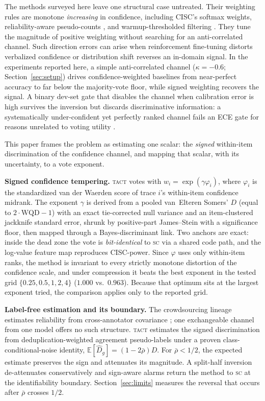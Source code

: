 \documentclass{article}
\newcommand{\Dhat}{\widehat{D}}
\newcommand{\SC}{\textsc{sc}}
\newcommand{\TACT}{\textsc{tact}}
\begin{document}
The methods surveyed here leave one structural case untreated. Their weighting
rules are monotone \emph{increasing} in confidence, including CISC's softmax
weights, reliability-aware pseudo-counts \citep{reasc2026}, and
warmup-thresholded filtering \citep{deepconf2025}. They tune the magnitude of
positive weighting without searching for an anti-correlated channel. Such
direction errors can arise when reinforcement fine-tuning distorts verbalized
confidence or distribution shift reverses an in-domain signal. In the
experiments reported here, a simple anti-correlated channel ($\kappa=-0.6$;
Section~\ref{sec:setup}) drives confidence-weighted baselines from near-perfect
accuracy to far below the majority-vote floor, while signed weighting recovers
the signal. A binary dev-set gate that disables the channel when calibration
error is high survives the inversion but discards discriminative information:
a systematically under-confident yet perfectly ranked channel fails an ECE
gate for reasons unrelated to voting utility
\citep{taubenfeld2025cisc,huang2024rankcalibration}.

This paper frames the problem as estimating one scalar: the \emph{signed} within-item discrimination of the confidence channel, and mapping that scalar, with its uncertainty, to a vote exponent.

\textbf{Signed confidence tempering.} \TACT{} votes with
$w_i=\exp(\gamma\varphi_i)$, where $\varphi_i$ is the standardized van der
Waerden score of trace $i$'s within-item confidence midrank. The exponent
$\gamma$ is derived from a pooled van~Elteren Somers' $D$ (equal to
$2\cdot\mathrm{WQD}-1$) with an exact tie-corrected null variance and an
item-clustered jackknife standard error, shrunk by positive-part James--Stein
with a significance floor, then mapped through a Bayes-discriminant link. Two
anchors are exact: inside the dead zone the vote is \emph{bit-identical} to
\SC{} via a shared code path, and the log-value feature map reproduces
CISC-power. Since $\varphi$ uses only within-item ranks, the method is
invariant to every strictly monotone distortion of the confidence scale, and
under compression it beats the best exponent in the tested grid
$\{0.25,0.5,1,2,4\}$ ($1.000$ vs.\ $0.963$). Because that optimum sits at the
largest exponent tried, the comparison applies only to the reported grid.

\textbf{Label-free estimation and its boundary.} The crowdsourcing lineage
estimates reliability from cross-annotator covariance
\citep{dawid1979maximum,parisi2014ranking}; one exchangeable channel from one
model offers no such structure. \TACT{} estimates the signed discrimination
from deduplication-weighted agreement pseudo-labels under a proven
class-conditional-noise identity, $\mathbb{E}[\Dhat_g]=(1-2\bar\rho)D$. For
$\bar\rho<1/2$, the expected estimate preserves the sign and attenuates its
magnitude. A split-half inversion
de-attenuates conservatively and sign-aware alarms return the method to \SC{}
at the identifiability boundary. Section~\ref{sec:limits} measures the reversal
that occurs after $\bar\rho$ crosses $1/2$.
\end{document}
